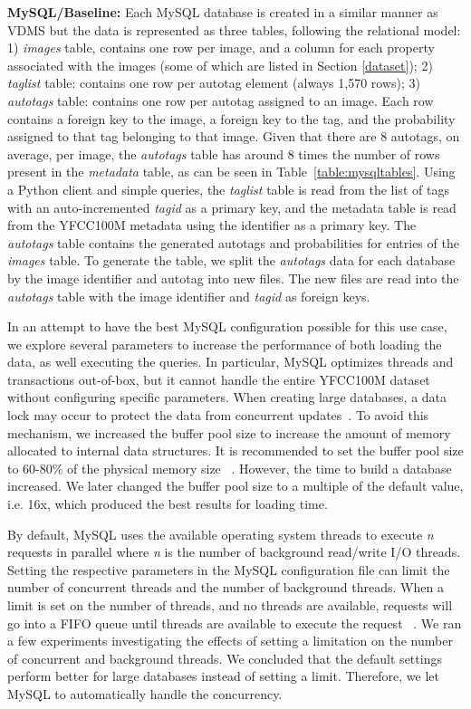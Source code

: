 \textbf{MySQL/Baseline:}
Each MySQL database is created in a similar manner as VDMS 
but the data is represented as three tables, following the relational model:
1) \textit{images} table, contains one row per image,
and a column for each property
associated with the images (some of which are listed in Section \ref{dataset});
2) \textit{taglist} table: contains one row per autotag element
(always 1,570 rows);
3) \textit{autotags} table: contains one row per autotag
assigned to an image. Each row contains a foreign key to the
image, a foreign key to the tag, and
the probability assigned to that tag belonging to that image.
Given that there are 8 autotags, on average, per image, the \textit{autotags}
table has around 8 times the number of rows present in the
\textit{metadata} table, as can be seen in Table~\ref{table:mysqltables}.
Using a Python client and simple queries, the \textit{taglist}
table is read from the list of tags with an auto-incremented
\textit{tagid} as a primary key, and the metadata table
is read from the YFCC100M metadata using the identifier as a primary key.
The \textit{autotags} table contains the generated autotags and
probabilities for entries of the \textit{images} table.
To generate the table, we split the \textit{autotags} data for each database
by the image identifier and autotag into new files.
The new files are read into the \textit{autotags} table with the image
identifier and \textit{tagid} as foreign keys.

In an attempt to have the best MySQL configuration possible for this use case, 
we explore several parameters to increase the performance of both loading the data, 
as well executing the queries.
In particular, MySQL optimizes threads and transactions out-of-box, 
but it cannot handle the entire YFCC100M dataset without configuring 
specific parameters.
When creating large databases, a data lock may occur to protect the
data from concurrent updates~\cite{mysql_blog}.
To avoid this mechanism, we increased the buffer pool size to
increase the amount of memory allocated to internal data structures.
It is recommended to set the buffer pool size to 60-80\% of the physical
memory size ~\cite{mysql,mysql_blog}.
However, the time to build a database increased. 
We later changed  the buffer pool size to a multiple of the default value, i.e. 16x,
which produced the best results for loading time.

By default, MySQL uses the available operating system threads to  
execute \textit{n} requests in parallel where \textit{n} is 
the number of background read/write I/O threads.
Setting the respective parameters in the MySQL configuration file can limit the
number of concurrent threads and the number of background threads.
When a limit is set on the number of threads, and no threads are available,
requests will go into a FIFO queue until threads are available to execute
the request ~\cite{mysql,mysql_blog}.
We ran a few experiments investigating the effects of setting a limitation on the
number of concurrent and background threads.
We concluded that the default settings perform better for large databases instead of
setting a limit.
Therefore, we let MySQL to automatically handle the concurrency.

